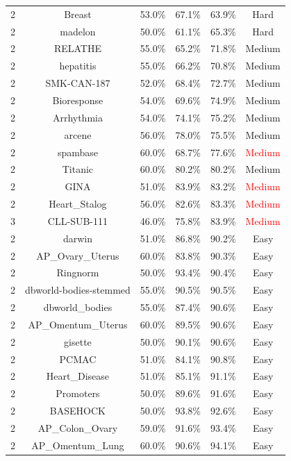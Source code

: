 \documentclass[preprint,12pt,authoryear]{elsarticle}
\begin{document}
{{\begin{longtable}{|p{1.4cm}|c|p{1.2cm}|c|c|c|}
\hline
\endlastfoot

2 & Breast & 53.0\% & 67.1\% & 63.9\% &{Hard} \\
2 & madelon & 50.0\% & 61.1\% & 65.3\% & {Hard} \\\hline
2 & RELATHE & 55.0\% & 65.2\% & 71.8\% & Medium \\
2 & hepatitis & 55.0\% & 66.2\% & 70.8\% & Medium \\
2 & SMK-CAN-187 & 52.0\% & 68.4\% & 72.7\% & Medium \\
2 & Bioresponse & 54.0\% & 69.6\% & 74.9\% & Medium \\
2 & Arrhythmia & 54.0\% & 74.1\% & 75.2\% & Medium \\
2 & arcene & 56.0\% & 78.0\% & 75.5\% & Medium \\
2 & spambase & 60.0\% & 68.7\% & 77.6\% & \textcolor{red}{Medium} \\
2 & Titanic & 60.0\% & 80.2\% & 80.2\% & Medium \\
2 & GINA & 51.0\% & 83.9\% & 83.2\% & \textcolor{red}{Medium} \\
2 & Heart\_Stalog & 56.0\% & 82.6\% & 83.3\% & \textcolor{red}{Medium} \\
3 & CLL-SUB-111 & 46.0\% & 75.8\% & 83.9\% & \textcolor{red}{Medium} \\\hline
2 & darwin & 51.0\% & 86.8\% & 90.2\% & Easy \\
2 & AP\_Ovary\_Uterus & 60.0\% & 83.8\% & 90.3\% & Easy \\
2 & Ringnorm & 50.0\% & 93.4\% & 90.4\% & Easy \\
2 & dbworld-bodies-stemmed & 55.0\% & 90.5\% & 90.5\% & Easy \\
2 & dbworld\_bodies & 55.0\% & 87.4\% & 90.6\% & Easy \\
2 & AP\_Omentum\_Uterus & 60.0\% & 89.5\% & 90.6\% & Easy \\
2 & gisette & 50.0\% & 90.1\% & 90.6\% & Easy \\
2 & PCMAC & 51.0\% & 84.1\% & 90.8\% & Easy \\
2 & Heart\_Disease & 51.0\% & 85.1\% & 91.1\% & Easy \\
2 & Promoters & 50.0\% & 89.6\% & 91.6\% & Easy \\
2 & BASEHOCK & 50.0\% & 93.8\% & 92.6\% & Easy \\
2 & AP\_Colon\_Ovary & 59.0\% & 91.6\% & 93.4\% & Easy \\
2 & AP\_Omentum\_Lung & 60.0\% & 90.6\% & 94.1\% & Easy \\

\end{longtable}}}
\end{document}

